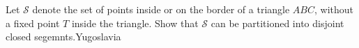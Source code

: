 Let $\mathcal S$ denote the set of points inside or on the border of a triangle $ABC$,  without a fixed point $T$ inside the triangle. Show that $\mathcal S$ can be partitioned into disjoint closed segemnts.Yugoslavia